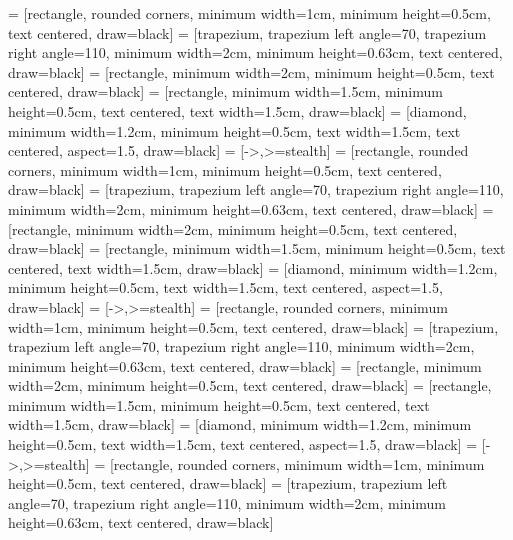 \makeatletter
\if@isELS
   = [rectangle, rounded corners, minimum width=1cm, minimum height=0.5cm, text centered, draw=black]
          = [trapezium, trapezium left angle=70, trapezium right angle=110, minimum width=2cm, minimum height=0.63cm, text centered, draw=black]
     = [rectangle, minimum width=2cm,   minimum height=0.5cm, text centered, draw=black]
   = [rectangle, minimum width=1.5cm, minimum height=0.5cm, text centered, text width=1.5cm, draw=black]
    = [diamond, minimum width=1.2cm, minimum height=0.5cm, text width=1.5cm, text centered, aspect=1.5, draw=black]
       = [->,>=stealth]
\fi
\if@isLNCS
   = [rectangle, rounded corners, minimum width=1cm, minimum height=0.5cm, text centered, draw=black]
          = [trapezium, trapezium left angle=70, trapezium right angle=110, minimum width=2cm, minimum height=0.63cm, text centered, draw=black]
     = [rectangle, minimum width=2cm,   minimum height=0.5cm, text centered, draw=black]
   = [rectangle, minimum width=1.5cm, minimum height=0.5cm, text centered, text width=1.5cm, draw=black]
    = [diamond, minimum width=1.2cm, minimum height=0.5cm, text width=1.5cm, text centered, aspect=1.5, draw=black]
       = [->,>=stealth]
  \newcommand{\markline}[1]{%
    \tikz[remember picture,baseline] \node (#1) {};%
  }
\fi
\if@isIEEE
   = [rectangle, rounded corners, minimum width=1cm, minimum height=0.5cm, text centered, draw=black]
          = [trapezium, trapezium left angle=70, trapezium right angle=110, minimum width=2cm, minimum height=0.63cm, text centered, draw=black]
     = [rectangle, minimum width=2cm,   minimum height=0.5cm, text centered, draw=black]
   = [rectangle, minimum width=1.5cm, minimum height=0.5cm, text centered, text width=1.5cm, draw=black]
    = [diamond, minimum width=1.2cm, minimum height=0.5cm, text width=1.5cm, text centered, aspect=1.5, draw=black]
       = [->,>=stealth]
\fi
\if@isICML
   = [rectangle, rounded corners, minimum width=1cm, minimum height=0.5cm, text centered, draw=black]
          = [trapezium, trapezium left angle=70, trapezium right angle=110, minimum width=2cm, minimum height=0.63cm, text centered, draw=black]
